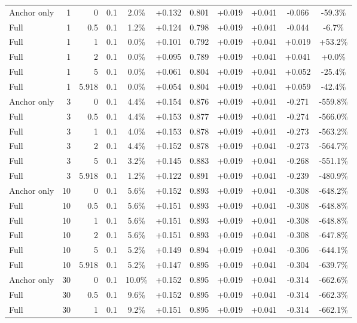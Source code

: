 \begin{table}[htbp]
\begin{tabular}{lrrrccccccc}
Anchor only & 1 & 0 & 0.1 & 2.0\% & +0.132 & 0.801 & +0.019 & +0.041 & -0.066 & -59.3\% \\
Full & 1 & 0.5 & 0.1 & 1.2\% & +0.124 & 0.798 & +0.019 & +0.041 & -0.044 & -6.7\% \\
Full & 1 & 1 & 0.1 & 0.0\% & +0.101 & 0.792 & +0.019 & +0.041 & +0.019 & +53.2\% \\
Full & 1 & 2 & 0.1 & 0.0\% & +0.095 & 0.789 & +0.019 & +0.041 & +0.041 & +0.0\% \\
Full & 1 & 5 & 0.1 & 0.0\% & +0.061 & 0.804 & +0.019 & +0.041 & +0.052 & -25.4\% \\
Full & 1 & 5.918 & 0.1 & 0.0\% & +0.054 & 0.804 & +0.019 & +0.041 & +0.059 & -42.4\% \\
Anchor only & 3 & 0 & 0.1 & 4.4\% & +0.154 & 0.876 & +0.019 & +0.041 & -0.271 & -559.8\% \\
Full & 3 & 0.5 & 0.1 & 4.4\% & +0.153 & 0.877 & +0.019 & +0.041 & -0.274 & -566.0\% \\
Full & 3 & 1 & 0.1 & 4.0\% & +0.153 & 0.878 & +0.019 & +0.041 & -0.273 & -563.2\% \\
Full & 3 & 2 & 0.1 & 4.4\% & +0.152 & 0.878 & +0.019 & +0.041 & -0.273 & -564.7\% \\
Full & 3 & 5 & 0.1 & 3.2\% & +0.145 & 0.883 & +0.019 & +0.041 & -0.268 & -551.1\% \\
Full & 3 & 5.918 & 0.1 & 1.2\% & +0.122 & 0.891 & +0.019 & +0.041 & -0.239 & -480.9\% \\
Anchor only & 10 & 0 & 0.1 & 5.6\% & +0.152 & 0.893 & +0.019 & +0.041 & -0.308 & -648.2\% \\
Full & 10 & 0.5 & 0.1 & 5.6\% & +0.151 & 0.893 & +0.019 & +0.041 & -0.308 & -648.8\% \\
Full & 10 & 1 & 0.1 & 5.6\% & +0.151 & 0.893 & +0.019 & +0.041 & -0.308 & -648.8\% \\
Full & 10 & 2 & 0.1 & 5.6\% & +0.151 & 0.893 & +0.019 & +0.041 & -0.308 & -647.8\% \\
Full & 10 & 5 & 0.1 & 5.2\% & +0.149 & 0.894 & +0.019 & +0.041 & -0.306 & -644.1\% \\
Full & 10 & 5.918 & 0.1 & 5.2\% & +0.147 & 0.895 & +0.019 & +0.041 & -0.304 & -639.7\% \\
Anchor only & 30 & 0 & 0.1 & 10.0\% & +0.152 & 0.895 & +0.019 & +0.041 & -0.314 & -662.6\% \\
Full & 30 & 0.5 & 0.1 & 9.6\% & +0.152 & 0.895 & +0.019 & +0.041 & -0.314 & -662.3\% \\
Full & 30 & 1 & 0.1 & 9.2\% & +0.151 & 0.895 & +0.019 & +0.041 & -0.314 & -662.1\% \\

\end{tabular}
\end{table}
